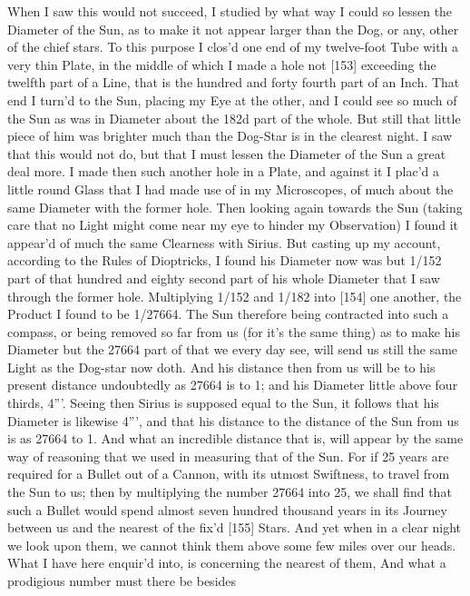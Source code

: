 \documentclass[letterpaper]{book}
\begin{document}
When I saw this would not succeed, I studied by what way I could so lessen
the Diameter of the Sun, as to make it not appear larger than the Dog,
or any, other of the chief stars. To this purpose I clos'd one end of my
twelve-foot Tube with a very thin Plate, in the middle of which I made a
hole not [153] exceeding the twelfth part of a Line, that is the hundred and
forty fourth part of an Inch. That end I turn'd to the Sun, placing my Eye
at the other, and I could see so much of the Sun as was in Diameter about
the 182d part of the whole. But still that little piece of him was brighter
much than the Dog-Star is in the clearest night. I saw that this would not
do, but that I must lessen the Diameter of the Sun a great deal more. I
made then such another hole in a Plate, and against it I plac'd a little round
Glass that I had made use of in my Microscopes, of much about the same
Diameter with the former hole. Then looking again towards the Sun (taking
care that no Light might come near my eye to hinder my Observation) I
found it appear'd of much the same Clearness with Sirius. But casting up
my account, according to the Rules of Dioptricks, I found his Diameter now
was but 1/152 part of that hundred and eighty second part of his whole
Diameter that I saw through the former hole. Multiplying 1/152 and 1/182
into [154] one another, the Product I found to be 1/27664. The Sun therefore
being contracted into such a compass, or being removed so far from us (for
it's the same thing) as to make his Diameter but the 27664 part of that we
every day see, will send us still the same Light as the Dog-star now doth.
And his distance then from us will be to his present distance undoubtedly
as 27664 is to 1; and his Diameter little above four thirds, 4”'. Seeing then
Sirius is supposed equal to the Sun, it follows that his Diameter is likewise
4”', and that his distance to the distance of the Sun from us is as 27664 to
1. And what an incredible distance that is, will appear by the same way of
reasoning that we used in measuring that of the Sun. For if 25 years are
required for a Bullet out of a Cannon, with its utmost Swiftness, to travel
from the Sun to us; then by multiplying the number 27664 into 25, we shall
find that such a Bullet would spend almost seven hundred thousand years
in its Journey between us and the nearest of the fix'd [155] Stars. And yet
when in a clear night we look upon them, we cannot think them above some
few miles over our heads. What I have here enquir'd into, is concerning
the nearest of them, And what a prodigious number must there be besides
\end{document}
